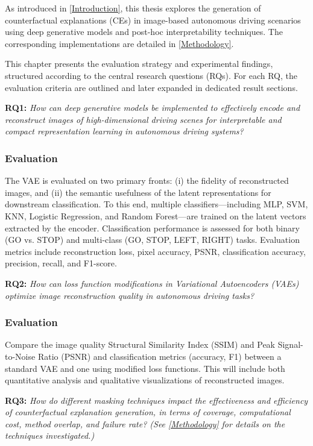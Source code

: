 As introduced in \cref{Introduction}, this thesis explores the generation of counterfactual explanations (CEs) in image-based autonomous driving scenarios using deep generative models and post-hoc interpretability techniques. The corresponding implementations are detailed in \cref{Methodology}.

This chapter presents the evaluation strategy and experimental findings, structured according to the central research questions (RQs). For each RQ, the evaluation criteria are outlined and later expanded in dedicated result sections.

\textbf{RQ1:} \textit{How can deep generative models be implemented to effectively encode and reconstruct images of high-dimensional driving scenes for interpretable and compact representation learning in autonomous driving systems?}

    \subsubsection*{Evaluation} 
    The VAE is evaluated on two primary fronts: (i) the fidelity of reconstructed images, and (ii) the semantic usefulness of the latent representations for downstream classification. To this end, multiple classifiers—including MLP, SVM, KNN, Logistic Regression, and Random Forest—are trained on the latent vectors extracted by the encoder. Classification performance is assessed for both binary (GO vs. STOP) and multi-class (GO, STOP, LEFT, RIGHT) tasks. Evaluation metrics include reconstruction loss, pixel accuracy, PSNR, classification accuracy, precision, recall, and F1-score.
    
\textbf{RQ2:} \textit{How can loss function modifications in Variational Autoencoders (VAEs) optimize image reconstruction quality in autonomous driving tasks?} 

    \subsubsection*{Evaluation} 
    Compare the image quality Structural Similarity Index (SSIM) and Peak Signal-to-Noise Ratio (PSNR) and classification metrics (accuracy, F1) between a standard VAE and one using modified loss functions. This will include both quantitative analysis and qualitative visualizations of reconstructed images.
    
\textbf{RQ3:} \textit{How do different masking techniques impact the effectiveness and efficiency of counterfactual explanation generation, in terms of coverage, computational cost, method overlap, and failure rate? (See \cref{Methodology} for details on the techniques investigated.)}

